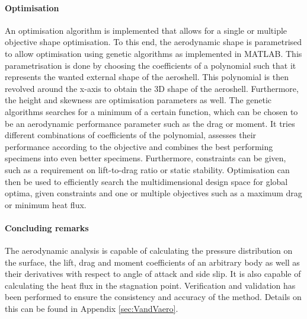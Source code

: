 \paragraph{Optimisation} \label{par:Optimisation}
An optimisation algorithm is implemented that allows for a single or multiple objective shape optimisation. To this end, the aerodynamic shape is parametrised to allow optimisation using genetic algorithms as implemented in MATLAB. This parametrisation is done by choosing the coefficients of a polynomial such that it represents the wanted external shape of the aeroshell. This polynomial is then revolved around the x-axis to obtain the 3D shape of the aeroshell. Furthermore, the height and skewness are optimisation parameters as well. The genetic algorithms searches for a minimum of a certain function, which can be chosen to be an aerodynamic performance parameter such as the drag or moment. It tries different combinations of coefficients of the polynomial, assesses their performance according to the objective and combines the best performing specimens into even better specimens. Furthermore, constraints can be given, such as a requirement on lift-to-drag ratio or static stability. Optimisation can then be used to efficiently search the multidimensional design space for global optima, given constraints and one or multiple objectives such as a maximum drag or minimum heat flux.

\paragraph{Concluding remarks}
The aerodynamic analysis is capable of calculating the pressure distribution on the surface, the lift, drag and moment coefficients of an arbitrary body as well as their derivatives with respect to angle of attack and side slip. It is also capable of calculating the heat flux in the stagnation point. Verification and validation has been performed to ensure the consistency and accuracy of the method. Details on this can be found in Appendix \ref{sec:VandVaero}.